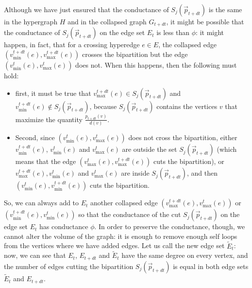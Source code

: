 \documentclass[../main.tex]{subfiles}
\begin{document}
Although we have just ensured that the conductance of $S_j(\vec{p}_{t+dt})$ is the same in the hypergraph $H$ and in the collapsed graph $G_{t+dt}$, it might be possible that the conductance of $S_j(\vec{p}_{t+dt})$ on the edge set $E_t$ is less than $\phi$: it might happen, in fact, that for a crossing hyperedge $e\in E$, the collapsed edge $(v_{\text{min}}^{t+dt}(e), v_{\text{max}}^{t+dt}(e))$ crosses the bipartition but the edge $(v_{\text{min}}^{t}(e), v_{\text{max}}^{t}(e))$ does not. When this happens, then the following must hold:

\begin{itemize}
    \item first, it must be true that $v_{\text{max}}^{t+dt}(e) \in S_j(\vec{p}_{t+dt})$ and $v_{\text{min}}^{t+dt}(e) \notin S_j(\vec{p}_{t+dt})$, because $S_j(\vec{p}_{t+dt})$ contains the vertices $v$ that maximize the quantity $\frac{p_{t+dt}(v)}{d(v)}$.
    \item Second, since $(v_{\text{min}}^t(e), v_{\text{max}}^t(e))$ does not cross the bipartition, either $v_{\text{min}}^{t+dt}(e)$, $v_{\text{min}}^{t}(e)$ and $v_{\text{max}}^{t}(e)$ are outside the set $S_j(\vec{p}_{t+dt})$ (which means that the edge $(v_{\text{max}}^{t}(e), v_{\text{max}}^{t+dt}(e))$ cuts the bipartition), or $v_{\text{max}}^{t+dt}(e), v_{\text{min}}^{t}(e)$ and $v_{\text{max}}^{t}(e)$ are inside $S_j(\vec{p}_{t+dt})$, and then  $(v_{\text{min}}^{t}(e), v_{\text{min}}^{t+dt}(e))$ cuts the bipartition. 
\end{itemize}

So, we can always add to $E_t$ another collapsed edge $(v_{\text{max}}^{t+dt}(e), v_{\text{max}}^{t}(e))$ or $(v_{\text{min}}^{t+dt}(e), v_{\text{min}}^{t}(e))$ so that the conductance of the cut $S_j(\vec{p}_{t+dt})$ on the edge set $E_t$ has conductance $\phi$.
In order to preserve the conductance, though, we cannot alter the volume of the graph: it is enough to remove enough self loops from the vertices where we have added edges. Let us call the new edge set $\tilde{E}_t$: now, we can see that $E_t$, $E_{t+dt}$ and $\tilde{E}_t$ have the same degree on every vertex, and the number of edges cutting the bipartition $S_j(\vec{p}_{t+dt})$ is equal in both edge sets $\tilde{E}_t$ and $E_{t+dt}$. 
\end{document}
